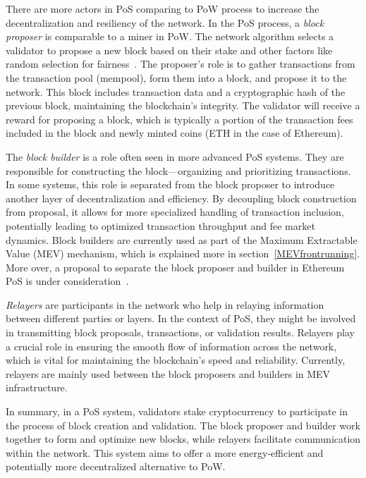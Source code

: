 There are more actors in PoS comparing to PoW process to increase the decentralization and resiliency of the network. In the PoS process, a \textit{block proposer} is comparable to a miner in PoW. The network algorithm selects a validator to propose a new block based on their stake and other factors like random selection for fairness~\cite{ethereumrandao}. The proposer's role is to gather transactions from the transaction pool (mempool), form them into a block, and propose it to the network. This block includes transaction data and a cryptographic hash of the previous block, maintaining the blockchain's integrity. The validator will receive a reward for proposing a block, which is typically a portion of the transaction fees included in the block and newly minted coins (ETH in the case of Ethereum).

The \textit{block builder} is a role often seen in more advanced PoS systems. They are responsible for constructing the block---organizing and prioritizing transactions. In some systems, this role is separated from the block proposer to introduce another layer of decentralization and efficiency. By decoupling block construction from proposal, it allows for more specialized handling of transaction inclusion, potentially leading to optimized transaction throughput and fee market dynamics. Block builders are currently used as part of the Maximum Extractable Value (MEV) mechanism, which is explained more in section~\ref{MEVfrontrunning}. More over, a proposal to separate the block proposer and builder in Ethereum PoS is under consideration~\cite{ethereumPBS}.

\textit{Relayers} are participants in the network who help in relaying information between different parties or layers. In the context of PoS, they might be involved in transmitting block proposals, transactions, or validation results. Relayers play a crucial role in ensuring the smooth flow of information across the network, which is vital for maintaining the blockchain's speed and reliability. Currently, relayers are mainly used between the block proposers and builders in MEV infrastructure.

In summary, in a PoS system, validators stake cryptocurrency to participate in the process of block creation and validation. The block proposer and builder work together to form and optimize new blocks, while relayers facilitate communication within the network. This system aims to offer a more energy-efficient and potentially more decentralized alternative to PoW.


